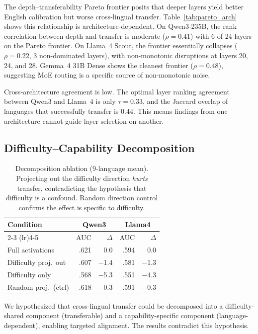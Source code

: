 \documentclass[11pt,a4paper]{article}
\begin{document}
The depth--transferability Pareto frontier posits that deeper layers yield better English calibration but worse cross-lingual transfer.
Table~\ref{tab:pareto_arch} shows this relationship is architecture-dependent.
On Qwen3-235B, the rank correlation between depth and transfer is moderate ($\rho{=}0.41$) with 6 of 24 layers on the Pareto frontier.
On Llama~4 Scout, the frontier essentially collapses ($\rho{=}0.22$, 3 non-dominated layers), with non-monotonic disruptions at layers 20, 24, and 28.
Gemma~4 31B Dense shows the cleanest frontier ($\rho{=}0.48$), suggesting MoE routing is a specific source of non-monotonic noise.

Cross-architecture agreement is low.
The optimal layer ranking agreement between Qwen3 and Llama~4 is only $\tau{=}0.33$, and the Jaccard overlap of languages that successfully transfer is $0.44$.
This means findings from one architecture cannot guide layer selection on another.

\subsection{Difficulty--Capability Decomposition}

\begin{table}[t]
\centering
\small
\begin{tabular}{lrrrr}
\toprule
\textbf{Condition} & \multicolumn{2}{c}{\textbf{Qwen3}} & \multicolumn{2}{c}{\textbf{Llama4}} \\
\cmidrule(lr){2-3} \cmidrule(lr){4-5}
& AUC & $\Delta$ & AUC & $\Delta$ \\
\midrule
Full activations     & .621 & 0.0  & .594 & 0.0 \\
Difficulty proj.\ out & .607 & $-$1.4 & .581 & $-$1.3 \\
Difficulty only      & .568 & $-$5.3 & .551 & $-$4.3 \\
Random proj.\ (ctrl) & .618 & $-$0.3 & .591 & $-$0.3 \\
\bottomrule
\end{tabular}
\caption{Decomposition ablation (9-language mean). Projecting out the difficulty direction \emph{hurts} transfer, contradicting the hypothesis that difficulty is a confound. Random direction control confirms the effect is specific to difficulty.}
\label{tab:decomposition}
\end{table}

We hypothesized that cross-lingual transfer could be decomposed into a difficulty-shared component (transferable) and a capability-specific component (language-dependent), enabling targeted alignment.
The results contradict this hypothesis.
\end{document}
